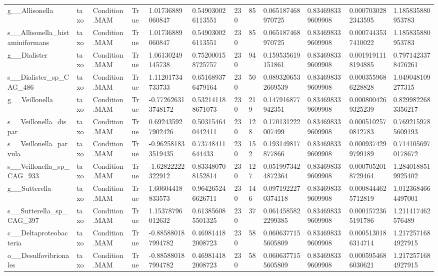 \begin{longtable}{llllllllllll}
g\_\_Allisonella & taxo & Condition.MAM & True & 1.01736889060847 & 0.549030026113551 & 230 & 85 & 0.065187468970725 & 0.834698339609908 & 0.0007030282343595 & 1.185835880953783 \\
s\_\_Allisonella\_histaminiformans & taxo & Condition.MAM & True & 1.01736889060847 & 0.549030026113551 & 230 & 85 & 0.065187468970725 & 0.834698339609908 & 0.0007443537410022 & 1.185835880953783 \\
g\_\_Dialister & taxo & Condition.MAM & True & 1.06130249145738 & 0.752000158725757 & 230 & 94 & 0.159535619151861 & 0.834698339609908 & 0.0019191118194885 & 0.7971423378476261 \\
s\_\_Dialister\_sp\_CAG\_486 & taxo & Condition.MAM & True & 1.11201734733733 & 0.651689376479164 & 230 & 50 & 0.0893206532669539 & 0.834698339609908 & 0.0003559686228828 & 1.049048109277315 \\
g\_\_Veillonella & taxo & Condition.MAM & True & -0.772626313748172 & 0.532141188671073 & 230 & 219 & 0.147916877942351 & 0.834698339609908 & 0.0008004269325239 & 0.8299822683356217 \\
s\_\_Veillonella\_dispar & taxo & Condition.MAM & True & 0.692435927902426 & 0.503154640442411 & 230 & 128 & 0.170131222007499 & 0.834698339609908 & 0.0005102570812783 & 0.7692159785609193 \\
s\_\_Veillonella\_parvula & taxo & Condition.MAM & True & -0.962581833519435 & 0.73748411644433 & 230 & 152 & 0.193149817877866 & 0.834698339609908 & 0.0009374299799189 & 0.7141056970178672 \\
s\_\_Veillonella\_sp\_CAG\_933 & taxo & Condition.MAM & True & -1.62822222322912 & 0.833480708152814 & 230 & 127 & 0.0519973424872364 & 0.834698339609908 & 0.0007052018729464 & 1.2840188519925402 \\
g\_\_Sutterella & taxo & Condition.MAM & True & 1.60604418833573 & 0.964265246626711 & 230 & 146 & 0.0971922270374118 & 0.834698339609908 & 0.0008444625712819 & 1.0123684664497001 \\
s\_\_Sutterella\_sp\_CAG\_397 & taxo & Condition.MAM & True & 1.15378796012632 & 0.613856085501325 & 230 & 37 & 0.0614585822299385 & 0.834698339609908 & 0.0001572365191786 & 1.211417462576489 \\
c\_\_Deltaproteobacteria & taxo & Condition.MAM & True & -0.885880187994782 & 0.469814182008723 & 230 & 58 & 0.0606377155605809 & 0.834698339609908 & 0.0005130186314714 & 1.2172571684927915 \\
o\_\_Desulfovibrionales & taxo & Condition.MAM & True & -0.885880187994782 & 0.469814182008723 & 230 & 58 & 0.0606377155605809 & 0.834698339609908 & 0.0005954686030621 & 1.2172571684927915 \\

\end{longtable}
